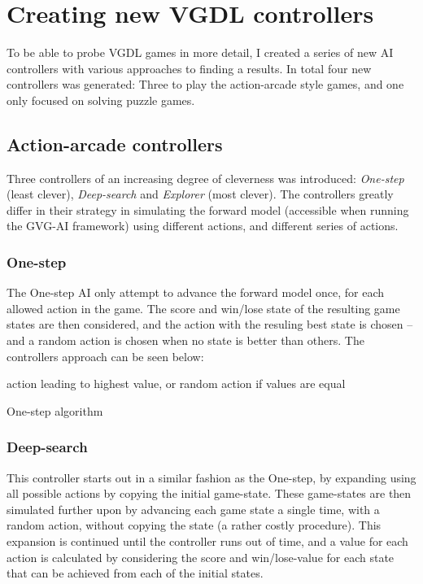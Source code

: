 \documentclass[a4paper,titlepage,final]{report}
\begin{document}
\section{Creating new VGDL controllers}
\label{sec_creatingnewcontrollers}
To be able to probe VGDL games in more detail, I created a series of new AI controllers with various approaches to finding a results.
In total four new controllers was generated: Three to play the action-arcade style games, and one only focused on solving puzzle games.

\subsection{Action-arcade controllers}
\label{ssec_actioncontrollers}

Three controllers of an increasing degree of cleverness was introduced: \textit{One-step} (least clever), \textit{Deep-search} and \textit{Explorer} (most clever). 
The controllers greatly differ in their strategy in simulating the forward model (accessible when running the GVG-AI framework) using different actions, and different series of actions.

\subsubsection*{One-step}
The One-step AI only attempt to advance the forward model once, for each allowed action in the game.
The score and win/lose state of the resulting game states are then considered, and the action with the resuling best state is chosen -- and a random action is chosen when no state is better than others.
The controllers approach can be seen below:

\begin{algorithm}[H]
\Return action leading to highest value, or random action if values are equal
\caption{One-step algorithm}
\end{algorithm}

\subsubsection*{Deep-search}
This controller starts out in a similar fashion as the One-step, by expanding using all possible actions by copying the initial game-state.
These game-states are then simulated further upon by advancing each game state a single time, with a random action, without copying the state (a rather costly procedure).
This expansion is continued until the controller runs out of time, and a value for each action is calculated by considering the score and win/lose-value for each state that can be achieved from each of the initial states. \\
\end{document}
